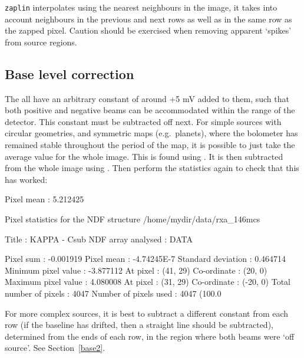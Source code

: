 \documentclass[11pt,noabs]{starlink}
\begin{document}
   \texttt{zaplin} interpolates using the nearest neighbours in the image,
   it takes into account neighbours in the previous and next rows as well
   as in the same row as the zapped pixel.
   Caution should be exercised when removing apparent
   `spikes' from source regions.

\subsection{\label{base}Base level correction}

   The
   all have an arbitrary constant of around +5 mV
   added to them, such that both positive and negative beams can be
   accommodated within the range of the detector. This constant must be
   subtracted off next. For simple sources with circular geometries, and
   symmetric maps (e.g.\ planets), where the bolometer has remained
   stable throughout the period of the map, it is possible to just take
   the average value for the whole image. This is found using
\texttt{}.
   It is then subtracted from the whole image using
\texttt{}.
   Then perform the statistics again to check that this
   has worked:

\begin{terminalv}
        Pixel mean             : 5.212425

  Pixel statistics for the NDF structure /home/mydir/data/rxa_146mcs

     Title                     : KAPPA - Csub
     NDF array analysed        : DATA

        Pixel sum              : -0.001919
        Pixel mean             : -4.74245E-7
        Standard deviation     : 0.464714
        Minimum pixel value    : -3.877112
           At pixel            : (41, 29)
           Co-ordinate         : (20, 0)
        Maximum pixel value    : 4.080008
           At pixel            : (31, 29)
           Co-ordinate         : (-20, 0)
        Total number of pixels : 4047
        Number of pixels used  : 4047 (100.0%
\end{terminalv}



   For more complex sources, it is best
   to subtract a different constant from each row (if the baseline has
   drifted, then a straight line should be subtracted), determined from
   the ends of each row, in the region where both beams were `off source'.
   See
Section~\ref{base2}.
\end{document}
